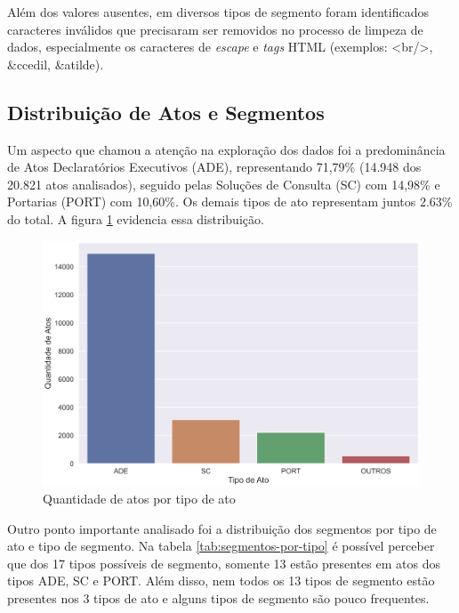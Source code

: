 Além dos valores ausentes, em diversos tipos de segmento foram identificados caracteres inválidos que precisaram ser removidos no processo de limpeza de dados, especialmente os caracteres de \textit{escape} e \textit{tags} HTML (exemplos: <br/>, \&ccedil, \&atilde).

\subsection{Distribuição de Atos e Segmentos \label{sec:dist-atos-segmentos}}

Um aspecto que chamou a atenção na exploração dos dados foi a predominância de Atos Declaratórios Executivos (ADE), representando 71,79\% (14.948 dos 20.821 atos analisados), seguido pelas Soluções de Consulta (SC) com 14,98\% e Portarias (PORT) com 10,60\%. Os demais tipos de ato representam juntos 2.63\% do total. A figura \ref{fig:atos-por-tipo-ato} evidencia essa distribuição.

\begin{figure}[h]
	\caption{Quantidade de atos por tipo de ato}
	\center
	\label{fig:atos-por-tipo-ato}
	\includegraphics[scale=1.9]{exploratoria/atos-por-tipo-ato.png}
	\fdp
\end{figure}

Outro ponto importante analisado foi a distribuição dos segmentos por tipo de ato e tipo de segmento. Na tabela \ref{tab:segmentos-por-tipo} é possível perceber que dos 17 tipos possíveis de segmento, somente 13 estão presentes em atos dos tipos ADE, SC e PORT. Além disso, nem todos os 13 tipos de segmento estão presentes nos 3 tipos de ato e alguns tipos de segmento são pouco frequentes.

